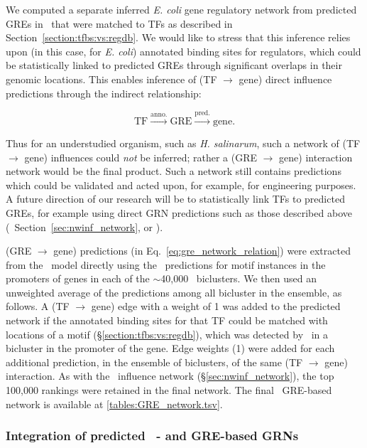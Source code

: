 We computed a separate inferred {\it E. coli} gene regulatory network
from predicted GREs in \egrine\ that were matched to TFs as described
in Section~\ref{section:tfbs:vs:regdb}. We would like to stress that
this inference relies upon (in this case, for {\it E. coli}) annotated
binding sites for regulators, which could be statistically linked to
predicted GREs through significant overlaps in their genomic
locations. This enables inference of (TF $\rightarrow$ gene) direct
influence predictions through the indirect relationship: 

\begin{equation}
\label{eq:gre_network_relation}
\mathrm{TF} \overset{\mathrm{anno.}}{\rightarrow} \mathrm{GRE} \overset{\mathrm{pred.}}{\rightarrow} \mathrm{gene}.
\end{equation}

\noindent Thus for an understudied organism, such as {\it
  H. salinarum}, such a network of (TF $\rightarrow$ gene) influences
could {\it not} be inferred; rather a (GRE $\rightarrow$ gene)
interaction network would be the final product. Such a network still
contains predictions which could be validated and acted upon, for
example, for engineering purposes. A future direction of our research
will be to statistically link TFs to predicted GREs, for example using
direct GRN predictions such as those described above
(\eg\ Section~\ref{sec:nwinf_network}, or \cite{Marbach2012}).

(GRE $\rightarrow$ gene) predictions (in
Eq.~\ref{eq:gre_network_relation}) were extracted from the
\egrine\ model directly using the \MEME\ predictions for motif
instances in the promoters of genes in each of the $\sim$40,000
\cm\ biclusters. We then used an unweighted average of the predictions
among all bicluster in the ensemble, as follows. A (TF $\rightarrow$
gene) edge with a weight of 1 was added to the predicted network if
the annotated binding sites for that TF could be matched with
locations of a motif (\S\ref{section:tfbs:vs:regdb}), which was
detected by \MEME\ in a bicluster in the promoter of the gene. Edge
weights (1) were added for each additional prediction, in the ensemble
of biclusters, of the same (TF $\rightarrow$ gene) interaction. As
with the \nwinf~influence network (\S\ref{sec:nwinf_network}), the top
100,000 rankings were retained in the final network. The final
\egrine~GRE-based network is available at
\ref{tables:GRE_network.tsv}.

\subsubsection{Integration of predicted \egrine~\nwinf- and GRE-based GRNs}

